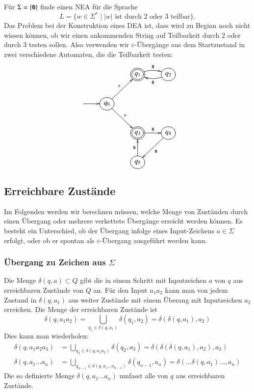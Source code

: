 \begin{beispiel}[\bf Teilbarkeit]
Für $\Sigma=\{{\tt 0}\}$ finde einen NEA für die Sprache 
\[
L=\{w\in \Sigma^*\;|\; \text{$|w|$ ist durch 2 oder 3 teilbar}\}.
\]
Das Problem bei der Konstruktion eines DEA ist, dass wird zu
Beginn noch nicht wissen können, ob wir einen ankommenden
String auf Teilbarkeit durch $2$ oder durch $3$ testen sollen.
Also verwenden wir $\varepsilon$-Übergänge aus dem Startzustand
in zwei verschiedene Automaten, die die Teilbarkeit testen:
\[
\entrymodifiers={++[o][F]}
\xymatrix{
*+\txt{}
	&*+\txt{}
		&*++[o][F=]{q_1} \ar@/^/[r]^{\tt 0}
			&{q_2} \ar@/^/[l]^{\tt 0}
\\
*+\txt{} \ar[r]
	&{q_0}\ar[ur]^{\varepsilon} \ar[dr]^{\varepsilon}
\\
*+\txt{}
	&*+\txt{}
		&*++[o][F=]{q_3}\ar[r]^{\tt 0}
			&{q_4}\ar[dl]^{\tt 0}
\\
*+\txt{}
	&*+\txt{}
		&{q_5}\ar[u]^{\tt 0}
}
\]
\end{beispiel}

\subsection{Erreichbare Zustände\label{regulaer:erreichbarezustaende}}
Im Folgenden werden wir berechnen müssen, welche Menge von Zuständen
durch einen Übergang oder mehrere verkettete Übergänge erreicht werden
können.
Es besteht ein Unterschied, ob der Übergang infolge eines
Input-Zeichens $a\in\Sigma$ erfolgt, oder ob er spontan als
$\varepsilon$-Übergang ausgeführt werden kann.

\subsubsection{Übergang zu Zeichen aus $\Sigma$}
Die Menge $\delta(q,a)\subset Q$ gibt die in einem Schritt mit Inputzeichen $a$
von $q$ aus erreichbaren Zustände von $Q$ an.
Für den Input $a_1a_2$ kann
man von jedem Zustand in $\delta(q,a_1)$ aus weiter Zustände mit einem
Überang mit Inputzeichen $a_2$ erreichen.
Die Menge der erreichbaren Zustände ist
\begin{equation}
\delta(q,a_1a_2)=\bigcup_{q_1\in\delta(q,a_1)}\delta(q_1, a_2)
=\delta(\delta(q,a_1),a_2)
\label{erreichbar}
\end{equation}
Dies kann man wiederholen:
\begin{align*}
\delta(q,a_1a_2a_3)&=
\bigcup_{q_2\in\delta(q, a_1a_2)}\delta(q_2,a_3)
=
\delta(\delta(\delta(q,a_1),a_2),a_3)
\\
\delta(q,a_1\dots a_n)&=\bigcup_{q_{n-1}\in\delta(q,a_1\dots a_{n-1})}\delta(q_{n-1},a_n)
=\delta(\dots \delta(q,a_1)\dots,a_n)
\end{align*}
Die so definierte Menge $\delta(q,a_1\dots a_n)$ umfasst alle von
$q$ aus erreichbaren Zustände.


